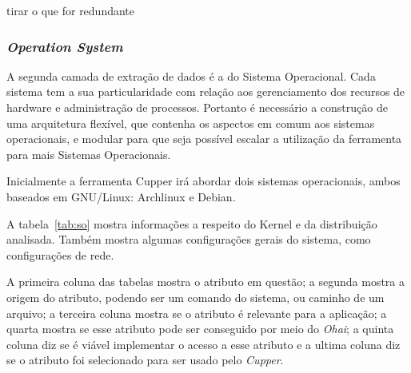 {\color{red} tirar o que for redundante}


\subsubsection{\textit{Operation System}}
\label{sec:cam-os}

A segunda camada de extração de dados é a do Sistema Operacional. 
Cada sistema tem a sua particularidade com relação aos gerenciamento dos 
recursos de hardware e administração de processos. Portanto é necessário a 
construção de uma arquitetura flexível, que contenha os aspectos em comum aos
sistemas operacionais, e modular para que seja possível escalar a utilização 
da ferramenta para mais Sistemas Operacionais.

Inicialmente a ferramenta Cupper irá abordar dois sistemas operacionais, 
ambos baseados em GNU/Linux: Archlinux e Debian.

A tabela~\ref{tab:so} mostra informações a respeito do Kernel e da distribuição
analisada. Também mostra algumas configurações gerais do sistema, como
configurações de rede.

A primeira coluna das tabelas mostra o atributo em questão; a segunda mostra
a origem do atributo, podendo ser um comando do sistema, ou caminho de um arquivo;
a terceira coluna mostra se o atributo é relevante para a aplicação; a quarta mostra se
esse atributo pode ser conseguido por meio do \textit{Ohai}; a quinta coluna 
diz se é viável implementar o acesso a esse atributo e a ultima coluna
diz se o atributo foi selecionado para ser usado pelo \textit{Cupper}.


